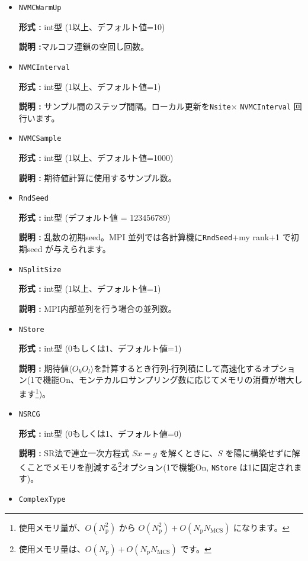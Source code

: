 \begin{itemize}
\item \verb|NVMCWarmUp|

{\bf 形式 :} int型 (1以上、デフォルト値=10)

{\bf 説明 :}マルコフ連鎖の空回し回数。

\item \verb|NVMCInterval|

{\bf 形式 :} int型 (1以上、デフォルト値=1)

{\bf 説明 :} サンプル間のステップ間隔。ローカル更新を\verb|Nsite|× \verb|NVMCInterval| 回行います。

\item \verb|NVMCSample|

{\bf 形式 :} int型 (1以上、デフォルト値=1000)

{\bf 説明 :} 期待値計算に使用するサンプル数。

\item \verb|RndSeed|

{\bf 形式 :} int型 (デフォルト値 = 123456789)

{\bf 説明 :} 乱数の初期seed。MPI 並列では各計算機に\verb|RndSeed|+my rank+1 で初期seed が与えられます。

 \item \verb|NSplitSize|

{\bf 形式 :} int型 (1以上、デフォルト値=1)

{\bf 説明 :} MPI内部並列を行う場合の並列数。

\item \verb|NStore|

{\bf 形式 :} int型 (0もしくは1、デフォルト値=1)

{\bf 説明 :} 期待値$\langle O_k O_l \rangle$を計算するとき行列-行列積にして高速化するオプション(1で機能On、{モンテカルロサンプリング数に応じてメモリの消費が増大します}\footnote{使用メモリ量が、$O(N_\text{p}^2)$ から $O(N_\text{p}^2) + O(N_\text{p}N_\text{MCS})$ になります。})。
 
\item \verb|NSRCG|

{\bf 形式 :} int型 (0もしくは1、デフォルト値=0)

{\bf 説明 :} SR法で連立一次方程式 $Sx=g$ を解くときに、$S$ を陽に構築せずに解くことでメモリを削減する\footnote{使用メモリ量は、$O(N_\text{p}) + O(N_\text{p}N_\text{MCS})$ です。}オプション\cite{NeuscammanUmrigarChan}(1で機能On, \verb|NStore| は1に固定されます)。
 
\item  \verb|ComplexType|
  

\end{itemize}
